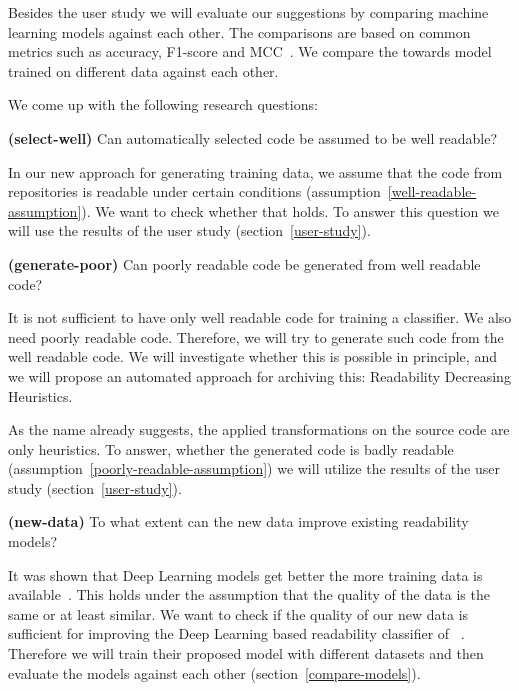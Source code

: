 \documentclass[%
class=scrreprt,
chapterprefix=false,%
open=right,%
twoside=false,%
paper=a4,%
logofile={Logo\_zentral\_farbig\_EN.png},%
thesistype=master,%
UKenglish,%
]{se2thesis}
\theoremstyle{definition}
\begin{document}
	Besides the user study we will evaluate our suggestions by comparing machine learning models against each other.
	The comparisons are based on common metrics such as accuracy, F1-score and MCC~\cite{chicco2020advantages}. We compare the towards model trained on different data against each other.
	
	We come up with the following research questions:
	
	\begin{resq} \textbf{(select-well)} Can automatically selected code be assumed to be well readable?\end{resq} \label{select-well}
	In our new approach for generating training data, we assume that the code from repositories is readable under certain conditions (assumption~\ref{well-readable-assumption}). We want to check whether that holds. To answer this question we will use the results of the user study (section~\ref{user-study}).
	
	\begin{resq} \textbf{(generate-poor)} Can poorly readable code be generated from well readable code?\end{resq} \label{generate-poor}
	It is not sufficient to have only well readable code for training a classifier. We also need poorly readable code. Therefore, we will try to generate such code from the well readable code. We will investigate whether this is possible in principle, and we will propose an automated approach for archiving this: Readability Decreasing Heuristics.
	
	As the name already suggests, the applied transformations on the source code are only heuristics. To answer, whether the generated code is badly readable (assumption~\ref{poorly-readable-assumption}) we will utilize the results of the user study (section~\ref{user-study}).
	
	
	\begin{resq} \textbf{(new-data)} To what extent can the new data improve existing readability models?\end{resq} \label{new-data}
	It was shown that Deep Learning models get better the more training data is available~\cite{hestness2017deep}. This holds under the assumption that the quality of the data is the same or at least similar. We want to check if the quality of our new data is sufficient for improving the Deep Learning based readability classifier of \citeauthor{mi2022towards}~\cite{mi2022towards}. Therefore we will train their proposed model with different datasets and then evaluate the models against each other (section~\ref{compare-models}).
		
\end{document}
